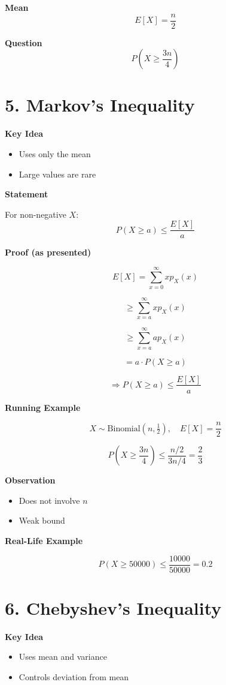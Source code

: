 \documentclass[12pt]{article}
\begin{document}
\textbf{Mean}
\[
E[X] = \frac{n}{2}
\]

\textbf{Question}
\[
P\left(X \geq \frac{3n}{4}\right)
\]

\section*{5. Markov’s Inequality}

\textbf{Key Idea}
\begin{itemize}
\item Uses only the mean
\item Large values are rare
\end{itemize}

\textbf{Statement}

For non-negative $X$:
\[
P(X \geq a) \leq \frac{E[X]}{a}
\]

\textbf{Proof (as presented)}

\[
E[X] = \sum_{x=0}^{\infty} x p_X(x)
\]

\[
\geq \sum_{x=a}^{\infty} x p_X(x)
\]

\[
\geq \sum_{x=a}^{\infty} a p_X(x)
\]

\[
= a \cdot P(X \geq a)
\]

\[
\Rightarrow P(X \geq a) \leq \frac{E[X]}{a}
\]

\textbf{Running Example}

\[
X \sim \text{Binomial}(n, \tfrac{1}{2}), \quad E[X] = \frac{n}{2}
\]

\[
P\left(X \geq \frac{3n}{4}\right) \leq \frac{n/2}{3n/4} = \frac{2}{3}
\]

\textbf{Observation}
\begin{itemize}
\item Does not involve $n$
\item Weak bound
\end{itemize}

\textbf{Real-Life Example}

\[
P(X \geq 50000) \leq \frac{10000}{50000} = 0.2
\]

\section*{6. Chebyshev’s Inequality}

\textbf{Key Idea}
\begin{itemize}
\item Uses mean and variance
\item Controls deviation from mean
\end{itemize}
\end{document}
